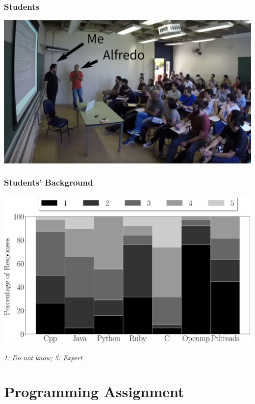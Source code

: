 \documentclass[10pt, compress, aspectratio=169]{beamer}
\begin{document}
\begin{frame}
    \frametitle{Students}
    \begin{center}
        \includegraphics[width=.8\textwidth]{students}
    \end{center}
\end{frame}

\begin{frame}
    \frametitle{Students' Background}
    \begin{center}
        \includegraphics[width=0.78\columnwidth]{background_questions}

        \emph{1: Do not know; 5: Expert}
    \end{center}
\end{frame}

\section{Programming Assignment}
\end{document}
